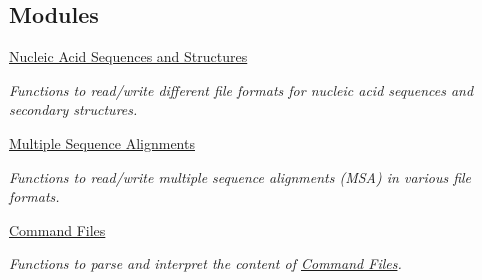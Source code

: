 \subsection*{Modules}
\begin{DoxyCompactItemize}
\item 
\hyperlink{group__file__formats}{Nucleic Acid Sequences and Structures}
\begin{DoxyCompactList}\small\item\em Functions to read/write different file formats for nucleic acid sequences and secondary structures. \end{DoxyCompactList}\item 
\hyperlink{group__file__formats__msa}{Multiple Sequence Alignments}
\begin{DoxyCompactList}\small\item\em Functions to read/write multiple sequence alignments (M\+SA) in various file formats. \end{DoxyCompactList}\item 
\hyperlink{group__command__files}{Command Files}
\begin{DoxyCompactList}\small\item\em Functions to parse and interpret the content of \hyperlink{file_formats_constraint-formats-file}{Command Files}. \end{DoxyCompactList}\end{DoxyCompactItemize}
